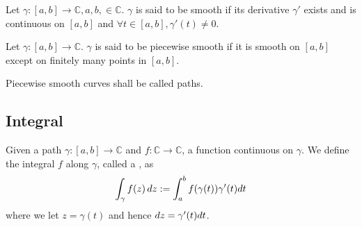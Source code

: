 \documentclass[11pt, oneside]{book}
\begin{document}
\begin{defn}\label{defn:smooth_curve}
	Let $\gamma : [a, b] \to \mathbb{C}, a, b, \in \mathbb{C}$. $\gamma$ is said to be smooth if its derivative $\gamma'$ exists and is continuous on $[a, b]$ and $\forall t \in [a, b], \gamma'(t) \neq 0$.
\end{defn}

\begin{defn}\label{defn:piecewise_smooth}
	Let $\gamma: [a, b] \to \mathbb{C}$. $\gamma$ is said to be piecewise smooth if it is smooth on $[a, b]$ except on finitely many points in $[a, b]$.
\end{defn}

\begin{remark}
	Piecewise smooth curves shall be called paths.
\end{remark}


\subsection{Integral} %
\label{sub:integral}

\begin{defn}[Contour]\label{defn:contour}
	Given a path $\gamma: [a, b] \to \mathbb{C}$ and $f : \mathbb{C} \to \mathbb{C}$, a function continuous on $\gamma$. We define the integral $f$ along $\gamma$, called a , as
	\begin{equation}
		\int_{\gamma} f(z) \mathop{}\!d{z} := \int_{a}^{b} f(\gamma(t))\gamma'(t) dt
	\end{equation}
	where we let $z = \gamma(t)$ and hence $\mathop{}\!d{z} = \gamma'(t) dt$.
\end{defn}
\end{document}
